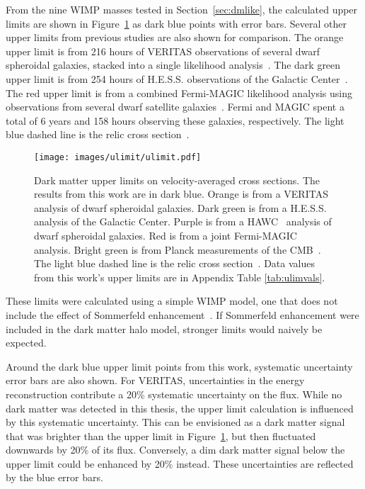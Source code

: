 From the nine WIMP masses tested in Section~\ref{sec:dmlike}, the calculated upper limits are shown in Figure~\ref{fig:ulim} as dark blue points with error bars.
Several other upper limits from previous studies are also shown for comparison.
The orange upper limit is from 216 hours of VERITAS observations of several dwarf spheroidal galaxies, stacked into a single likelihood analysis~\cite{veritas_dm_limit}.
The dark green upper limit is from 254 hours of H.E.S.S. observations of the Galactic Center~\cite{hessgcul}.
The red upper limit is from a combined Fermi-MAGIC likelihood analysis using observations from several dwarf satellite galaxies~\cite{fermagicul}.
Fermi and MAGIC spent a total of 6 years and 158 hours observing these galaxies, respectively.
The light blue dashed line is the relic cross section~\cite{updatedWIMPRelicCrossSection}.


\begin{figure}[tb]
  \centering
  \texttt{[image: images/ulimit/ulimit.pdf]}
  \caption[Dark Matter Upper Limit]{
    Dark matter upper limits on velocity-averaged cross sections.
    The results from this work are in dark blue.
    Orange is from a VERITAS~\cite{veritas_dm_limit} analysis of dwarf spheroidal galaxies.
    Dark green is from a H.E.S.S.~\cite{hessgcul} analysis of the Galactic Center.
    Purple is from a HAWC~\cite{hawc_dm_limit} analysis of dwarf spheroidal galaxies.
    Red is from a joint Fermi-MAGIC~\cite{fermagicul} analysis.
    Bright green is from Planck measurements of the CMB~\cite{planck_dm_limit}.
    The light blue dashed line is the relic cross section~\cite{updatedWIMPRelicCrossSection}.
    Data values from this work's upper limits are in Appendix Table \ref{tab:ulimvals}.
  }
  \label{fig:ulim}
\end{figure}

These limits were calculated using a simple WIMP model, one that does not include the effect of Sommerfeld enhancement~\cite{sommerfeld}.
If Sommerfeld enhancement were included in the dark matter halo model, stronger limits would naively be expected.

Around the dark blue upper limit points from this work, systematic uncertainty error bars are also shown.
For VERITAS, uncertainties in the energy reconstruction contribute a \nicetilde{}20\% systematic uncertainty on the flux.
While no dark matter was detected in this thesis, the upper limit calculation is influenced by this systematic uncertainty.
This can be envisioned as a dark matter signal that was brighter than the upper limit in Figure~\ref{fig:ulim}, but then fluctuated downwards by 20\% of its flux.
Conversely, a dim dark matter signal below the upper limit could be enhanced by 20\% instead.
These uncertainties are reflected by the blue error bars.

